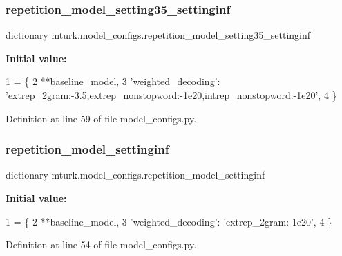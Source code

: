 \subsubsection{\texorpdfstring{repetition\+\_\+model\+\_\+setting35\+\_\+settinginf}{repetition\_model\_setting35\_settinginf}}
{\footnotesize\ttfamily dictionary mturk.\+model\+\_\+configs.\+repetition\+\_\+model\+\_\+setting35\+\_\+settinginf}

{\bfseries Initial value\+:}
\begin{DoxyCode}
1 =  \{
2     **baseline\_model,
3     \textcolor{stringliteral}{'weighted\_decoding'}: \textcolor{stringliteral}{'extrep\_2gram:-3.5,extrep\_nonstopword:-1e20,intrep\_nonstopword:-1e20'},
4 \}
\end{DoxyCode}


Definition at line 59 of file model\+\_\+configs.\+py.

\mbox{\label{namespacemturk_1_1model__configs_a92226cc19426c2690d7b7e5caaf0673d}} 
\subsubsection{\texorpdfstring{repetition\+\_\+model\+\_\+settinginf}{repetition\_model\_settinginf}}
{\footnotesize\ttfamily dictionary mturk.\+model\+\_\+configs.\+repetition\+\_\+model\+\_\+settinginf}

{\bfseries Initial value\+:}
\begin{DoxyCode}
1 =  \{
2     **baseline\_model,
3     \textcolor{stringliteral}{'weighted\_decoding'}: \textcolor{stringliteral}{'extrep\_2gram:-1e20'},
4 \}
\end{DoxyCode}


Definition at line 54 of file model\+\_\+configs.\+py.

\mbox{\label{namespacemturk_1_1model__configs_af1125670130d68ed01f999d051a4bc5f}} 

